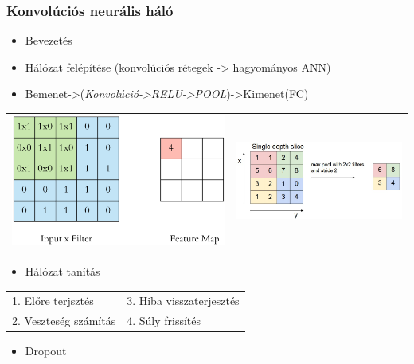 \documentclass{beamer}
\begin{document}
\begin{frame}[fragile]
\frametitle{Konvolúciós neurális háló}
\begin{itemize}
\item Bevezetés
\item Hálózat felépítése (konvolúciós rétegek -> hagyományos ANN)
\item Bemenet->(\textit{Konvolúció->RELU->POOL})->Kimenet(FC)
\end{itemize}
\begin{tabular}{c c}
\includegraphics[scale=0.15]{convolution} & \includegraphics[scale=0.2]{maxpool}
\end{tabular}
\begin{itemize}
\item Hálózat tanítás
\end{itemize}
\begin{table}
\centering
\begin{tabular}{l l}
	1. Előre terjsztés & 3. Hiba visszaterjesztés\\
	2. Veszteség számítás & 4. Súly frissítés
\end{tabular}
\end{table}
\begin{itemize}
\item Dropout
\end{itemize}
\end{frame}
\end{document}
